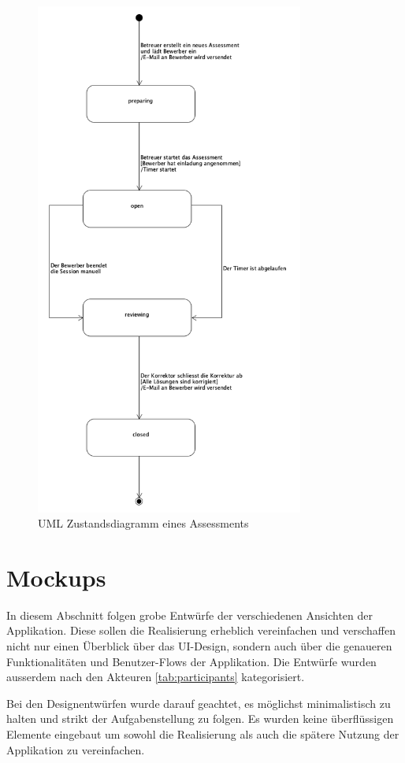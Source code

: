 \begin{figure}[H]
    \centering
    \includegraphics[height=17cm]{images/diagrams/state.png}
    \caption{\label{fig:state-diagram}UML Zustandsdiagramm eines Assessments}
\end{figure}

\newpage

\section{Mockups}

In diesem Abschnitt folgen grobe Entwürfe der verschiedenen Ansichten der Applikation. Diese sollen die Realisierung
erheblich vereinfachen und verschaffen nicht nur einen Überblick über das UI-Design, sondern auch über die genaueren
Funktionalitäten und Benutzer-Flows der Applikation. Die Entwürfe wurden ausserdem nach den Akteuren \ref{tab:participants} kategorisiert.

Bei den Designentwürfen wurde darauf geachtet, es möglichst minimalistisch zu halten und strikt der Aufgabenstellung zu folgen. 
Es wurden keine überflüssigen Elemente eingebaut um sowohl die Realisierung als auch die spätere Nutzung der Applikation zu vereinfachen.

